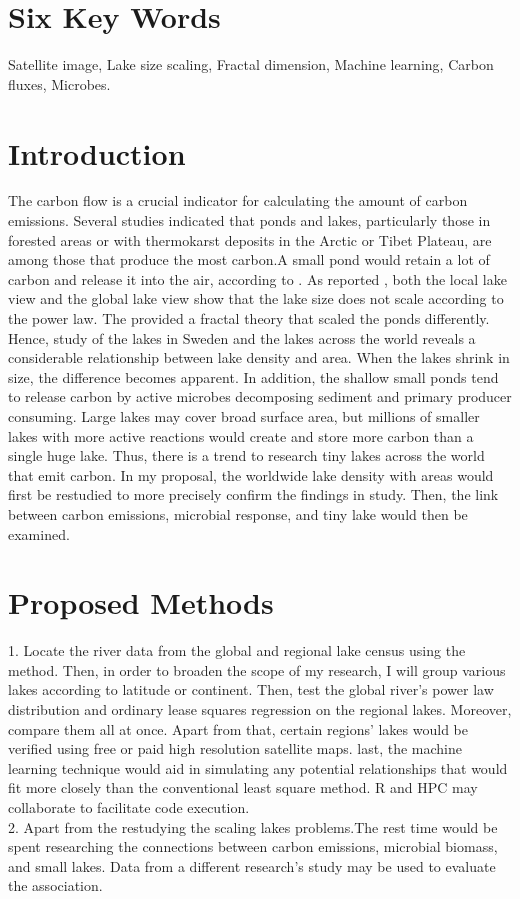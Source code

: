 
\section{Six Key Words}
Satellite image, Lake size scaling, Fractal dimension, Machine learning, Carbon fluxes, Microbes. 
\section{Introduction}
The carbon flow is a crucial indicator for calculating the amount of carbon emissions. Several studies indicated that ponds and lakes, particularly those in forested areas or with thermokarst deposits in the Arctic or Tibet Plateau, are among those that produce the most carbon\citep{serikova2019high,holgerson2017gas,karlsson2021carbon}.A small pond would retain a lot of carbon and release it into the air, according to \cite{holgerson2016large}. As \cite{cael2016size} reported , both the local lake view and the global lake view show that the lake size does not scale according to the power law. The \cite{mandelbrot1982fractal} provided a fractal theory that scaled the ponds differently. Hence, \cite{cael2016size} study of the lakes in Sweden and the lakes across the world reveals a considerable relationship between lake density and area. When the lakes shrink in size, the difference becomes apparent. In addition, the shallow small ponds tend to release carbon by active microbes decomposing sediment and primary producer consuming\citep{bartosiewicz2015greenhouse,colina2022role}. Large lakes may cover broad surface area, but millions of smaller lakes with more active reactions would create and store more carbon than a single huge lake.
Thus, there is a trend to research tiny lakes across the world that emit carbon. In my proposal, the worldwide lake density with areas would first be restudied to more precisely confirm the findings in \cite{cael2016size} study. Then, the link between carbon emissions, microbial response, and tiny lake would then be examined.

\section{Proposed Methods}

1. Locate the river data from the global and regional lake census using the \cite{cael2016size} method. Then, in order to broaden the scope of my research, I will group various lakes according to latitude or continent. Then, test the global river's power law distribution and ordinary lease squares regression on the regional lakes. Moreover, compare them all at once. Apart from that, certain regions' lakes would be verified using free or paid high resolution satellite maps. last, the machine learning technique would aid in simulating any potential relationships that would fit more closely than the conventional least square method. R and HPC may collaborate to facilitate code execution.
\\
2. Apart from the restudying the scaling lakes problems.The rest time would be spent researching the connections between carbon emissions, microbial biomass, and small lakes. Data from a different research's study may be used to evaluate the association.

